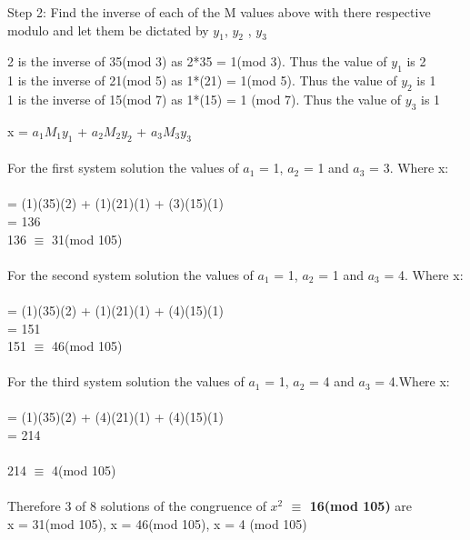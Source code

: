 \documentclass{article}
\begin{document}
Step 2: Find the inverse of each of the M values above with there respective modulo and let them be dictated by $y_{1}$, $y_{2}$ , $y_{3}$  
\begin{center}
2 is the inverse of 35(mod 3) as 2*35 = 1(mod 3). Thus the value of $y_{1}$ is 2 \\
1 is the inverse of 21(mod 5) as 1*(21) = 1(mod 5). Thus the value of $y_{2}$ is 1 \\ 
1 is the inverse of 15(mod 7) as 1*(15) = 1 (mod 7). Thus the value of $y_{3}$ is 1
\end{center}
x = $a_{1}$$M_{1}$$y_{1}$ + $a_{2}$$M_{2}$$y_{2}$ + $a_{3}$$M_{3}$$y_{3}$ \\\\
For the first system solution the values of $a_{1}$ = 1, $a_{2}$ = 1 and $a_{3}$ = 3. Where x: \\ \\
= (1)(35)(2) + (1)(21)(1) + (3)(15)(1) \\ 
= 136 \\
136 $\equiv$ 31(mod 105) \\\\
For the second system solution the values of $a_{1}$ = 1, $a_{2}$ = 1 and $a_{3}$ = 4. Where x: \\ \\
= (1)(35)(2) + (1)(21)(1) + (4)(15)(1) \\ 
= 151 \\
151 $\equiv$ 46(mod 105) \\\\
For the third system solution the values of $a_{1}$ = 1, $a_{2}$ = 4 and $a_{3}$ = 4.Where x: \\ \\
= (1)(35)(2) + (4)(21)(1) + (4)(15)(1) \\ 
=  214\\\\
214 $\equiv$ 4(mod 105) \\\\
Therefore 3 of 8 solutions of the congruence of \textbf{ $x^2$ $\equiv$ 16(mod 105)} are \\ x = 31(mod 105), x = 46(mod 105), x = 4 (mod 105)

\newpage
\end{document}
